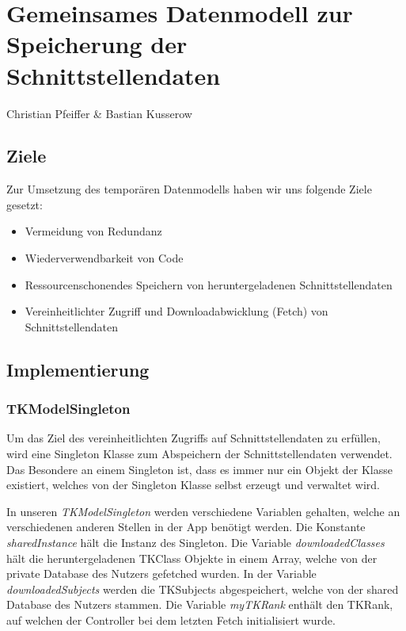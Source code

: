 \chapter{Gemeinsames Datenmodell zur Speicherung der Schnittstellendaten}
Christian Pfeiffer \& Bastian Kusserow
\section{Ziele}
Zur Umsetzung des temporären Datenmodells haben wir uns folgende Ziele gesetzt:

\begin{itemize}
\item Vermeidung von Redundanz
\item Wiederverwendbarkeit von Code
\item Ressourcenschonendes Speichern von heruntergeladenen Schnittstellendaten
\item Vereinheitlichter Zugriff und Downloadabwicklung (Fetch) von Schnittstellendaten
\end{itemize}

\section{Implementierung}

\subsection{TKModelSingleton} \label{TKModelSingleton}
Um das Ziel des vereinheitlichten Zugriffs auf Schnittstellendaten zu erfüllen, wird eine Singleton Klasse zum Abspeichern der Schnittstellendaten verwendet.
Das Besondere an einem Singleton ist, dass es immer nur ein Objekt der Klasse existiert, welches von der Singleton Klasse selbst erzeugt und verwaltet wird. 



In unseren \textit{TKModelSingleton} werden verschiedene Variablen gehalten, welche an verschiedenen anderen Stellen in der App benötigt werden. Die Konstante \textit{sharedInstance} hält die Instanz des Singleton. Die Variable \textit{downloadedClasses} hält die heruntergeladenen TKClass Objekte in einem Array, welche von der private Database des Nutzers gefetched wurden. In der Variable \textit{downloadedSubjects} werden die TKSubjects abgespeichert, welche von der shared Database des Nutzers stammen. Die Variable \textit{myTKRank} enthält den TKRank, auf welchen der Controller bei dem letzten Fetch initialisiert wurde.


